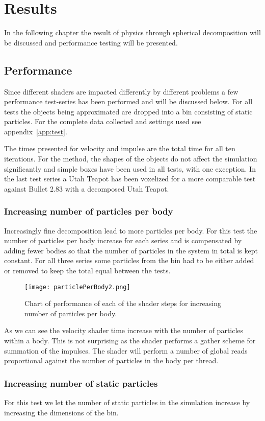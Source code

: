\chapter{Results}
In the following chapter the result of physics through spherical decomposition will
be discussed and performance testing will be presented.

\section{Performance}
Since different shaders are impacted differently by different problems a few performance
test-series has been performed and will be discussed below.
For all tests the objects being approximated
are dropped into a bin consisting of static particles. For the complete data collected and
settings used see appendix~\ref{app:test}.

The times presented for velocity and impulse
are the total time for all ten iterations. For the method, the shapes of the objects
 do not affect the simulation significantly and simple boxes have been used in all tests, with one exception.
 In the last test series a Utah Teapot has been voxelized for a more comparable
 test against Bullet 2.83 with a decomposed Utah Teapot.

\subsection{Increasing number of particles per body}
Increasingly fine decomposition lead to more particles per body.
For this test the number of particles per body increase for each series and is
compensated by adding fewer bodies so that the number of particles in the system
in total is kept constant. For all three series some particles from the bin had to be
either added or removed to keep the total equal between the tests.
\begin{figure}[H]
  \centering
  \texttt{[image: particlePerBody2.png]}
  \caption{Chart of performance of each of the shader steps for increasing number of particles per body.}
  \label{fig:particlePerBody}
\end{figure}
As we can see the velocity shader time increase with the number of particles
within a body. This is not surprising as the shader performs a gather scheme for
summation of the impulses. The shader will perform a number of global reads proportional
against the number of particles in the body per thread.

\subsection{Increasing number of static particles}
For this test we let the number of static particles in the simulation increase
by increasing the dimensions of the bin.

